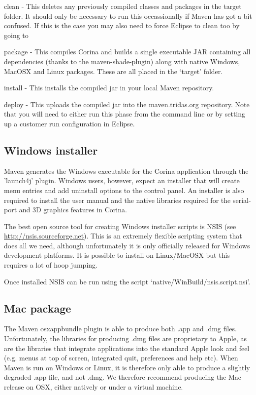 \begin{description*}
 \item[clean] - This deletes any previously compiled classes and packages in the target folder.  It should only be necessary to run this occassionally if Maven has got a bit confused.  If this is the case you may also need to force Eclipse to clean too by going to 
 \item[package] - This compiles Corina and builds a single executable JAR containing all dependencies (thanks to the maven-shade-plugin) along with native Windows, MacOSX and Linux packages.  These are all placed in the `target' folder.
 \item[install] - This installs the compiled jar in your local Maven repository.
 \item[deploy] - This uploads the compiled jar into the maven.tridas.org repository.  Note that you will need to either run this phase from the command line or by setting up a customer run configuration in Eclipse.
\end{description*}



\subsection{Windows installer}
\label{txt:windowsInstaller}
Maven generates the Windows executable for the Corina application through the 'launch4j' plugin.  Windows users, however, expect an installer that will create menu entries and add uninstall options to the control panel.  An installer is also required to install the user manual and the native libraries required for the serial-port and 3D graphics features in Corina.  

The best open source tool for creating Windows installer scripts is NSIS (see \url{http://nsis.sourceforge.net}).  This is an extremely flexible scripting system that does all we need, although unfortunately it is only officially released for Windows development platforms.  It is possible to install on Linux/MacOSX but this requires a lot of hoop jumping.  

Once installed NSIS can be run using the script `native/WinBuild/nsis.script.nsi'.

\subsection{Mac package}
The Maven osxappbundle plugin is able to produce both .app and .dmg files.  Unfortunately, the libraries for producing .dmg files are proprietary to Apple, as are the libraries that integrate applications into the standard Apple look and feel (e.g. menus at top of screen, integrated quit, preferences and help etc).  When Maven is run on Windows or Linux, it is therefore only able to produce a slightly degraded .app file, and not .dmg.  We therefore recommend producing the Mac release on OSX, either natively or under a virtual machine.


